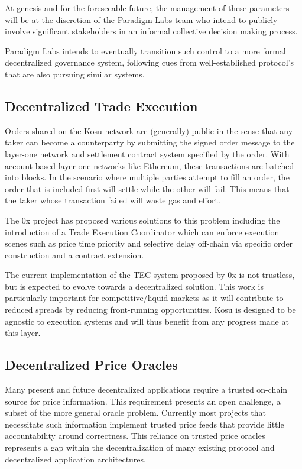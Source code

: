 \documentclass[10pt]{article}
\begin{document}
At genesis and for the foreseeable future, the management of these parameters will be at the discretion of the Paradigm Labs team who intend to publicly involve significant stakeholders in an informal collective decision making process. 
\medskip

Paradigm Labs intends to eventually transition such control to a more formal decentralized governance system, following cues from well-established protocol’s that are also pursuing similar systems.

\subsection{Decentralized Trade Execution}\label{future-work-tec}
Orders shared on the Kosu network are (generally) public in the sense that any taker can become a counterparty by submitting the signed order message to the layer-one network and settlement contract system specified by the order. With account based layer one networks like Ethereum, these transactions are batched into blocks. In the scenario where multiple parties attempt to fill an order, the order that is included first will settle while the other will fail. This means that the taker whose transaction failed will waste gas and effort.
\medskip

The 0x project has proposed various solutions to this problem including the introduction of a Trade Execution Coordinator which can enforce execution scenes such as price time priority and selective delay off-chain via specific order construction and a contract extension\cite{0x-selective-delay}.
\medskip

The current implementation of the TEC system proposed by 0x is not trustless, but is expected to evolve towards a decentralized solution\cite{0x-coordinator-specification}. This work is particularly important for competitive/liquid markets as it will contribute to reduced spreads by reducing front-running opportunities. Kosu is designed to be agnostic to execution systems and will thus benefit from any progress made at this layer.

\subsection{Decentralized Price Oracles}\label{future-work-oracles}
Many present and future decentralized applications require a trusted on-chain source for price information. This requirement presents an open challenge, a subset of the more general oracle problem. Currently most projects that necessitate such information implement trusted price feeds that provide little accountability around correctness. This reliance on trusted price oracles represents a gap within the decentralization of many existing protocol and decentralized application architectures.
\medskip
\end{document}
